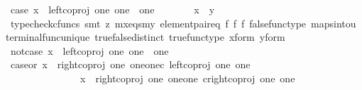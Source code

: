 \begin{isabellebody}
\ case{}{\isacharcolon}{\kern0pt}\ {\isachardoublequoteopen}x\ {\isacharequal}{\kern0pt}\ left{\isacharunderscore}{\kern0pt}coproj\ one\ {\isacharparenleft}{\kern0pt}one\ {\isasymCoprod}\ one{\isacharparenright}{\kern0pt}{\isachardoublequoteclose}\isanewline
\ \ \ \ \isamarkupfalse%
\ \isamarkupfalse%
\ {\isachardoublequoteopen}x\ {\isacharequal}{\kern0pt}\ y{\isachardoublequoteclose}\isanewline
\ \ \ \ \ \ \isamarkupfalse%
\ {\isacharparenleft}{\kern0pt}typecheck{\isacharunderscore}{\kern0pt}cfuncs{\isacharcomma}{\kern0pt}\ smt\ {\isacharparenleft}{\kern0pt}z{}{\isacharparenright}{\kern0pt}\ mx{\isacharunderscore}{\kern0pt}eqs{\isacharunderscore}{\kern0pt}my\ element{\isacharunderscore}{\kern0pt}pair{\isacharunderscore}{\kern0pt}eq\ f{}\ f{}\ f{}\ false{\isacharunderscore}{\kern0pt}func{\isacharunderscore}{\kern0pt}type\ maps{\isacharunderscore}{\kern0pt}into{\isacharunderscore}{\kern0pt}{}u{}\ terminal{\isacharunderscore}{\kern0pt}func{\isacharunderscore}{\kern0pt}unique\ true{\isacharunderscore}{\kern0pt}false{\isacharunderscore}{\kern0pt}distinct\ true{\isacharunderscore}{\kern0pt}func{\isacharunderscore}{\kern0pt}type\ x{\isacharunderscore}{\kern0pt}form\ y{\isacharunderscore}{\kern0pt}form{\isacharparenright}{\kern0pt}\isanewline
\ \ \isamarkupfalse%
\isanewline
\ \ \ \ \isamarkupfalse%
\ not{\isacharunderscore}{\kern0pt}case{}{\isacharcolon}{\kern0pt}\ {\isachardoublequoteopen}x\ {\isasymnoteq}\ left{\isacharunderscore}{\kern0pt}coproj\ one\ {\isacharparenleft}{\kern0pt}one\ {\isasymCoprod}\ one{\isacharparenright}{\kern0pt}{\isachardoublequoteclose}\isanewline
\ \ \ \ \isamarkupfalse%
\ \isamarkupfalse%
\ case{}{\isacharunderscore}{\kern0pt}or{\isacharunderscore}{\kern0pt}{}{\isacharcolon}{\kern0pt}\ {\isachardoublequoteopen}x\ {\isacharequal}{\kern0pt}\ {\isacharparenleft}{\kern0pt}right{\isacharunderscore}{\kern0pt}coproj\ one\ {\isacharparenleft}{\kern0pt}one{\isasymCoprod}one{\isacharparenright}{\kern0pt}{\isasymcirc}\isactrlsub c\ left{\isacharunderscore}{\kern0pt}coproj\ one\ one{\isacharparenright}{\kern0pt}{\isasymor}\ \isanewline
\ \ \ \ \ \ \ \ \ \ \ \ \ \ \ x\ {\isacharequal}{\kern0pt}\ right{\isacharunderscore}{\kern0pt}coproj\ one\ {\isacharparenleft}{\kern0pt}one{\isasymCoprod}one{\isacharparenright}{\kern0pt}\ {\isasymcirc}\isactrlsub c{\isacharparenleft}{\kern0pt}right{\isacharunderscore}{\kern0pt}coproj\ one\ one{\isacharparenright}{\kern0pt}{\isachardoublequoteclose}\isanewline

\end{isabellebody}
